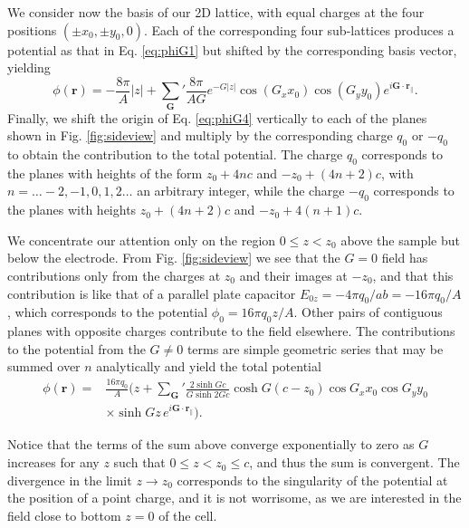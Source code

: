 \documentclass[review,sort&compress]{cas-sc}
\newcommand{\abs}[1]{\lvert#1\rvert}
\begin{document}
We consider now the basis of our 2D lattice, with equal charges at the
four positions $(\pm x_0, \pm y_0,0)$. Each of the corresponding four
sub-lattices produces a potential as that in Eq. \eqref{eq:phiG1} but
shifted by the corresponding basis vector, yielding
\begin{equation}
  \label{eq:phiG4}
  \phi(\bm r) = -\frac{8\pi}{A} \abs{z}
    +{\sum_{\bm G}}' \frac{8\pi}{AG} e^{- G \abs{z}}\cos(G_x x_0)
    \cos(G_y y_0) e^{i \bm G\cdot\bm r_\|}.
\end{equation}
Finally, we shift the origin of Eq. \eqref{eq:phiG4} vertically to each of the planes shown in
Fig. \ref{fig:sideview} and multiply by the corresponding charge $q_0$
or $-q_0$ to obtain the contribution to the total potential. The charge $q_0$ corresponds to
the planes with heights of the form $z_0+4nc$ and $-z_0+(4n+2)c$, with
$n=\ldots-2,-1,0,1,2\ldots$ an arbitrary integer, while the charge
$-q_0$ corresponds to the planes with heights $z_0+(4n+2)c$ and
$-z_0+4(n+1)c$.

We concentrate our attention only on the region $0\le z<z_0$ above the
sample but below the electrode. From
Fig. \ref{fig:sideview} we see that the $G=0$
field has contributions only from the charges at $z_0$ and their
images at $-z_0$, and that this contribution is like that of a parallel plate
capacitor $E_{0z}=-4\pi q_0/ab=-16\pi q_0/A$, which corresponds to the
potential $\phi_0=16\pi q_0 z/A$. Other pairs of contiguous planes with opposite charges
contribute to the field elsewhere. The contributions to the potential
from the $G\ne0$ terms are simple geometric series that may be summed
over $n$ analytically and yield the total potential
\begin{equation}
  \label{eq:phitot}
  \begin{split}
    \phi(\bm r)=&\frac{16\pi q_0}{A}\biggl(z+{\sum_{\bm G}}'\frac{2\sinh
      Gc}{G \sinh 2Gc}\cosh G(c-z_0)\cos G_x x_0 \cos G_y y_0\\
    &\times \sinh Gz\, e^{i\bm G\cdot\bm r_\|}\biggr).
  \end{split}
\end{equation}

Notice that the terms of the sum above converge exponentially to zero
as $G$ increases for any $z$ such that $0\le z <z_0 \le c$, and thus
the sum is convergent. The divergence in the limit $ z
\longrightarrow z_0 $ corresponds to the singularity of the potential
at the position of a point charge, and it is not worrisome, as we are
interested in the field close to bottom $z=0$ of the cell.
\end{document}
